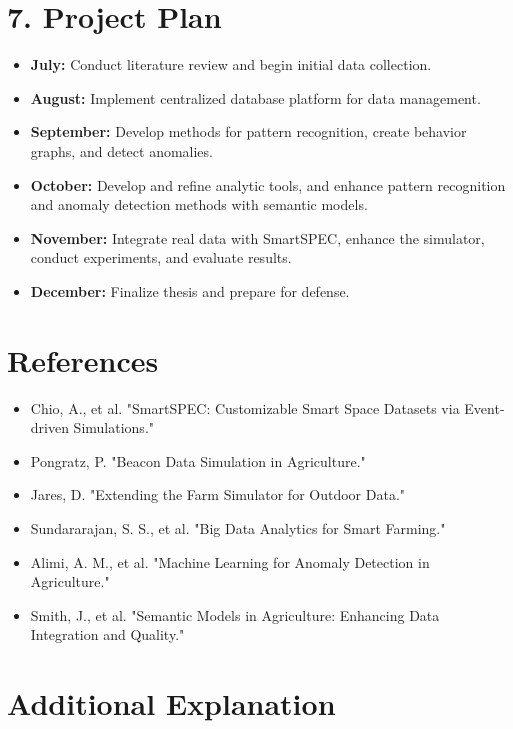 \documentclass[11pt]{article}
\begin{document}
\section*{7. Project Plan}
\begin{itemize}
    \item \textbf{July:} Conduct literature review and begin initial data collection.
    \item \textbf{August:} Implement centralized database platform for data management.
    \item \textbf{September:} Develop methods for pattern recognition, create behavior graphs, and detect anomalies.
    \item \textbf{October:} Develop and refine analytic tools, and enhance pattern recognition and anomaly detection methods with semantic models.
    \item \textbf{November:} Integrate real data with SmartSPEC, enhance the simulator, conduct experiments, and evaluate results.
    \item \textbf{December:} Finalize thesis and prepare for defense.
\end{itemize}

\section*{References}
\begin{itemize}
    \item Chio, A., et al. "SmartSPEC: Customizable Smart Space Datasets via Event-driven Simulations."
    \item Pongratz, P. "Beacon Data Simulation in Agriculture."
    \item Jares, D. "Extending the Farm Simulator for Outdoor Data."
    \item Sundararajan, S. S., et al. "Big Data Analytics for Smart Farming."
    \item Alimi, A. M., et al. "Machine Learning for Anomaly Detection in Agriculture."
    \item Smith, J., et al. "Semantic Models in Agriculture: Enhancing Data Integration and Quality."
\end{itemize}


\section*{Additional Explanation}
\end{document}

